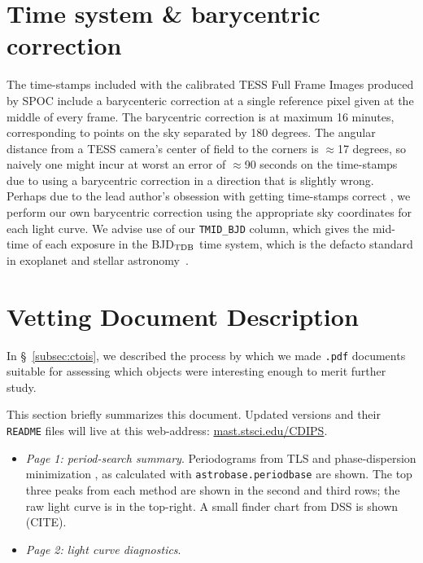 \documentclass[12pt,twocolumn,tighten]{aastex62}
\begin{document}
\section{Time system \& barycentric correction}
The time-stamps included with the calibrated TESS Full Frame Images
produced by SPOC include a barycenteric correction at
a single reference pixel given at the middle of every frame.
The barycentric correction is at maximum 16 minutes, corresponding to
points on the sky separated by 180 degrees.
The angular distance from a TESS camera's center of field to the corners
is $\approx$17 degrees, so naively one might incur at worst an error of
$\approx$90 seconds on the time-stamps due to using a barycentric
correction in a direction that is slightly wrong.
Perhaps due to the lead author's obsession with getting time-stamps correct 
\citep{bouma_wasp-4b_2019},
we perform our own barycentric correction using the appropriate
sky coordinates for each light curve.
We advise use of our \texttt{TMID\_BJD} column, which gives the
mid-time of each exposure in the BJD$_{\rm TDB}$ time system, which
is the defacto standard in exoplanet and stellar
astronomy~\citep{eastman_achieving_2010}.

\section{Vetting Document Description}

In \S~\ref{subsec:ctois}, we described the process by which we made 
\texttt{.pdf} documents suitable for assessing which objects were interesting 
enough to merit further study.

This section briefly summarizes this document. Updated versions and their 
\texttt{README} files will live at this web-address: 
\url{mast.stsci.edu/CDIPS}.

\begin{itemize}
\item {\it Page 1: period-search summary}. Periodograms from TLS and 
phase-dispersion minimization 
\citep{hippke_TLS_2019,stellingwerf_period_1978}, as calculated 
with \texttt{astrobase.periodbase} are shown. The top three peaks from each 
method are shown in the second and third rows; the raw light curve is in the 
top-right. A small finder chart from DSS is shown (CITE).

\item {\it Page 2: light curve diagnostics}.
\end{itemize}
\end{document}
